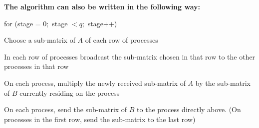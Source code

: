 \documentclass[]{scrartcl}
\begin{document}
\textbf{The algorithm can also be written in the following way:}

\begin{enumerate}
	\item for (stage = 0$;$ stage $<q;$ stage++) 
	{\setlength\itemindent{25pt} \item Choose a sub-matrix of $A$ of each row of processes}
	{\setlength\itemindent{25pt} \item In each row of processes broadcast the sub-matrix chosen in that row to the other processes in that row}
	{\setlength\itemindent{25pt} \item On each process, multiply the newly received sub-matrix of $A$ by the sub-matrix of $B$ currently residing on the process}
	{\setlength\itemindent{25pt} \item On each process, send the sub-matrix of $B$ to the process directly above. (On processes in the first row, send the sub-matrix to the last row)}
\end{enumerate}
\end{document}
